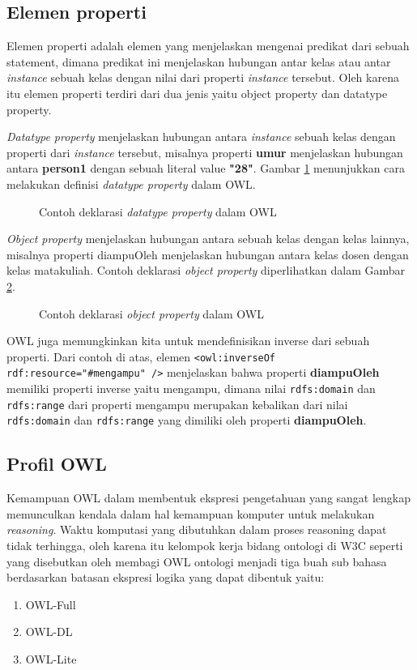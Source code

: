 \subsection{Elemen properti}
Elemen properti adalah elemen yang menjelaskan mengenai predikat dari sebuah statement, dimana predikat ini menjelaskan hubungan antar kelas atau antar \emph{instance} sebuah kelas dengan nilai dari properti \emph{instance} tersebut. Oleh karena itu elemen properti terdiri dari dua jenis yaitu object property dan datatype property.

\emph{Datatype property} menjelaskan hubungan antara \textit{instance} sebuah kelas dengan properti dari \textit{instance} tersebut, misalnya properti \textbf{umur} menjelaskan hubungan antara \textbf{person1} dengan sebuah literal value \textbf{"28"}. Gambar \ref{fig:deklarasi_dp_owl} menunjukkan cara melakukan definisi \emph{datatype property} dalam OWL.
\begin{figure}[hb]
	\centering
	
	\caption{Contoh deklarasi \emph{datatype property} dalam OWL}
	\label{fig:deklarasi_dp_owl}
\end{figure}

\emph{Object property} menjelaskan hubungan antara sebuah kelas dengan kelas lainnya, misalnya properti diampuOleh menjelaskan hubungan antara kelas dosen dengan kelas matakuliah. Contoh deklarasi \emph{object property} diperlihatkan dalam Gambar \ref{fig:deklarasi_op_owl}.
\begin{figure}[ht]
	\centering
	
	\caption{Contoh deklarasi \emph{object property} dalam OWL}
	\label{fig:deklarasi_op_owl}
\end{figure}

OWL juga memungkinkan kita untuk mendefinisikan inverse dari sebuah properti. Dari contoh di atas, elemen \texttt{<owl:inverseOf rdf:resource="\#mengampu" />} menjelaskan bahwa properti \textbf{diampuOleh} memiliki properti inverse yaitu mengampu, dimana nilai \texttt{rdfs:domain} dan \texttt{rdfs:range} dari properti mengampu merupakan kebalikan dari nilai \texttt{rdfs:domain} dan \texttt{rdfs:range} yang dimiliki oleh properti \textbf{diampuOleh}.

\subsection{Profil OWL}
Kemampuan OWL dalam membentuk ekspresi pengetahuan yang sangat lengkap memunculkan kendala dalam hal kemampuan komputer untuk melakukan \emph{reasoning}. Waktu komputasi yang dibutuhkan dalam proses reasoning dapat tidak terhingga, oleh karena itu kelompok kerja bidang ontologi di W3C seperti yang disebutkan oleh \citet*{mcguinness_vanharmelen} membagi OWL ontologi menjadi tiga buah sub bahasa berdasarkan batasan ekspresi logika yang dapat dibentuk yaitu:
\begin{enumerate}
	\item OWL-Full
	\item OWL-DL
	\item OWL-Lite
\end{enumerate}

